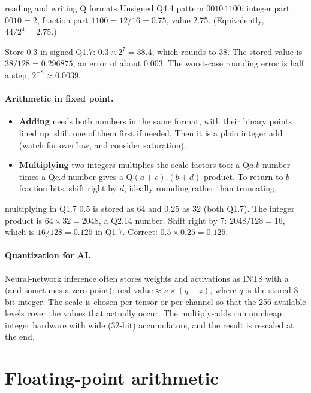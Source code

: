 \begin{worked}{reading and writing Q formats}
Unsigned Q4.4 pattern $0010\,1100$: integer part $0010 = 2$, fraction part $1100 = 12/16 = 0.75$, value 2.75. (Equivalently, $44 / 2^4 = 2.75$.)

Store 0.3 in signed Q1.7: $0.3 \times 2^7 = 38.4$, which rounds to 38. The stored value is $38/128 = 0.296875$, an error of about 0.003. The worst-case rounding error is half a step, $2^{-8} \approx 0.0039$.
\end{worked}

\paragraph{Arithmetic in fixed point.}
\begin{itemize}
  \item \textbf{Adding} needs both numbers in the same format, with their binary points lined up: shift one of them first if needed. Then it is a plain integer add (watch for overflow, and consider saturation).
  \item \textbf{Multiplying} two integers multiplies the scale factors too: a Q$a$.$b$ number times a Q$c$.$d$ number gives a Q$(a{+}c)$.$(b{+}d)$ product. To return to $b$ fraction bits, shift right by $d$, ideally rounding rather than truncating.
\end{itemize}

\begin{worked}{multiplying in Q1.7}
$0.5$ is stored as $64$ and $0.25$ as $32$ (both Q1.7). The integer product is $64 \times 32 = 2048$, a Q2.14 number. Shift right by 7: $2048 / 128 = 16$, which is $16/128 = 0.125$ in Q1.7. Correct: $0.5 \times 0.25 = 0.125$.
\end{worked}

\paragraph{Quantization for AI.} Neural-network inference often stores weights and activations as INT8 with a  (and sometimes a zero point): $\text{real value} \approx s \times (q - z)$, where $q$ is the stored 8-bit integer. The scale is chosen per tensor or per channel so that the 256 available levels cover the values that actually occur. The multiply-adds run on cheap integer hardware with wide (32-bit) accumulators, and the result is rescaled at the end.

\section{Floating-point arithmetic}
\label{sec:fparith}

